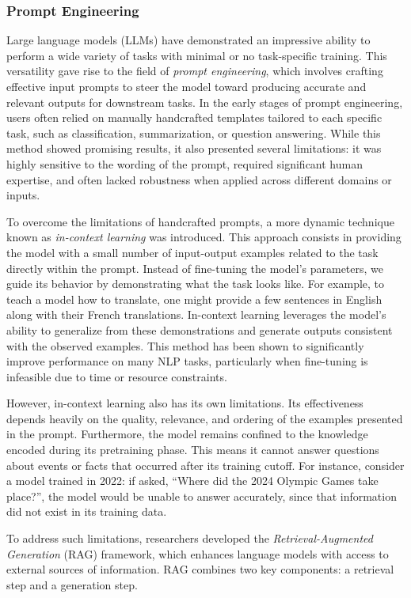         \subsubsection{Prompt Engineering}

Large language models (LLMs) have demonstrated an impressive ability to perform a wide variety of tasks with minimal or no task-specific training. This versatility gave rise to the field of \textit{prompt engineering}, which involves crafting effective input prompts to steer the model toward producing accurate and relevant outputs for downstream tasks. In the early stages of prompt engineering, users often relied on manually handcrafted templates tailored to each specific task, such as classification, summarization, or question answering. While this method showed promising results, it also presented several limitations: it was highly sensitive to the wording of the prompt, required significant human expertise, and often lacked robustness when applied across different domains or inputs.

To overcome the limitations of handcrafted prompts, a more dynamic technique known as \textit{in-context learning} was introduced. This approach consists in providing the model with a small number of input-output examples related to the task directly within the prompt. Instead of fine-tuning the model's parameters, we guide its behavior by demonstrating what the task looks like. For example, to teach a model how to translate, one might provide a few sentences in English along with their French translations. In-context learning leverages the model's ability to generalize from these demonstrations and generate outputs consistent with the observed examples. This method has been shown to significantly improve performance on many NLP tasks, particularly when fine-tuning is infeasible due to time or resource constraints.

However, in-context learning also has its own limitations. Its effectiveness depends heavily on the quality, relevance, and ordering of the examples presented in the prompt. Furthermore, the model remains confined to the knowledge encoded during its pretraining phase. This means it cannot answer questions about events or facts that occurred after its training cutoff. For instance, consider a model trained in 2022: if asked, “Where did the 2024 Olympic Games take place?”, the model would be unable to answer accurately, since that information did not exist in its training data.

To address such limitations, researchers developed the \textit{Retrieval-Augmented Generation} (RAG) framework, which enhances language models with access to external sources of information. RAG combines two key components: a retrieval step and a generation step.

